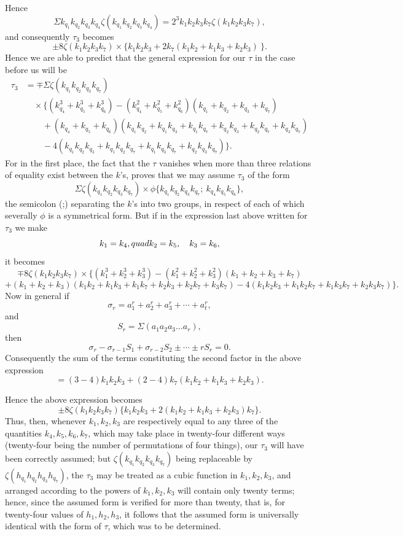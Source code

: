 \documentclass[11pt]{article}
\newcommand{\sourcepage}[1]{\marginpar{\scriptsize p.~#1}}
\begin{document}
Hence
\[
\Sigma k_{q_1}k_{q_2}k_{q_3}k_{q_4}\zeta(k_{q_1}k_{q_2}k_{q_3}k_{q_4})
=2^3k_1k_2k_3k_7\zeta(k_1k_2k_3k_7),
\]
and consequently $\tau_3$ becomes
\[
\pm8\zeta(k_1k_2k_3k_7)\times
\{k_1k_2k_3+2k_7(k_1k_2+k_1k_3+k_2k_3)\
\}.
\]
Hence we are able to predict that the general expression for our $\tau$ in the case before us will be
\[
\begin{aligned}
\tau_3&=\mp\Sigma\zeta(k_{q_1}k_{q_2}k_{q_3}k_{q_7})\\
&\quad\times\{(k_{q_4}^3+k_{q_5}^3+k_{q_6}^3)
-(k_{q_4}^2+k_{q_5}^2+k_{q_6}^2)(k_{q_1}+k_{q_2}+k_{q_3}+k_{q_7})\\
&\qquad +(k_{q_4}+k_{q_5}+k_{q_6})(k_{q_1}k_{q_2}+k_{q_1}k_{q_3}+k_{q_1}k_{q_7}+k_{q_2}k_{q_3}+k_{q_2}k_{q_7}+k_{q_3}k_{q_7})\\
&\qquad -4(k_{q_1}k_{q_2}k_{q_3}+k_{q_1}k_{q_2}k_{q_7}+k_{q_1}k_{q_3}k_{q_7}+k_{q_2}k_{q_3}k_{q_7})\}.
\end{aligned}
\]
For in the first place, the fact that the $\tau$ vanishes when more than three relations of equality exist between the $k$'s, proves that we may assume $\tau_3$ of the form
\[
\Sigma\zeta(k_{q_1}k_{q_2}k_{q_3}k_{q_7})\times
\phi\{k_{q_1}k_{q_2}k_{q_3}k_{q_7};\ k_{q_4}k_{q_5}k_{q_6}\},
\]
the semicolon (;) separating the $k$'s into two groups, in respect of each of which severally $\phi$ is a symmetrical form. But if in the expression last above written for $\tau_3$ we make
\[
k_1=k_4,\\quad k_2=k_5,\quad k_3=k_6,
\]
it becomes
\[
\mp8\zeta(k_1k_2k_3k_7)\times\{(k_1^3+k_2^3+k_3^3)-(k_1^2+k_2^2+k_3^2)(k_1+k_2+k_3+k_7)
\]
\[
+(k_1+k_2+k_3)(k_1k_2+k_1k_3+k_1k_7+k_2k_3+k_2k_7+k_3k_7)-4(k_1k_2k_3+k_1k_2k_7+k_1k_3k_7+k_2k_3k_7)\}.
\]
Now in general if
\[
\sigma_r=a_1^r+a_2^r+a_3^r+\cdots+a_t^r,
\]
and
\[
S_r=\Sigma(a_1a_2a_3\ldots a_r),
\]
then
\[
\sigma_r-\sigma_{r-1}S_1+\sigma_{r-2}S_2\pm\cdots\pm rS_r=0.
\]
Consequently the sum of the terms constituting the second factor in the above expression
\[
=(3-4)k_1k_2k_3+(2-4)k_7(k_1k_2+k_1k_3+k_2k_3).
\]

\sourcepage{491}
Hence the above expression becomes
\[
\pm8\zeta(k_1k_2k_3k_7)\{k_1k_2k_3+2(k_1k_2+k_1k_3+k_2k_3)k_7\}.
\]
Thus, then, whenever $k_1,k_2,k_3$ are respectively equal to any three of the quantities $k_4,k_5,k_6,k_7$, which may take place in twenty-four different ways (twenty-four being the number of permutations of four things), our $\tau_3$ will have been correctly assumed; but $\zeta(k_{q_1}k_{q_2}k_{q_3}k_{q_7})$ being replaceable by $\zeta(h_{q_1}h_{q_2}h_{q_3}h_{q_7})$, the $\tau_3$ may be treated as a cubic function in $k_1,k_2,k_3$, and arranged according to the powers of $k_1,k_2,k_3$ will contain only twenty terms; hence, since the assumed form is verified for more than twenty, that is, for twenty-four values of $h_1,h_2,h_3$, it follows that the assumed form is universally identical with the form of $\tau$, which was to be determined.
\end{document}
